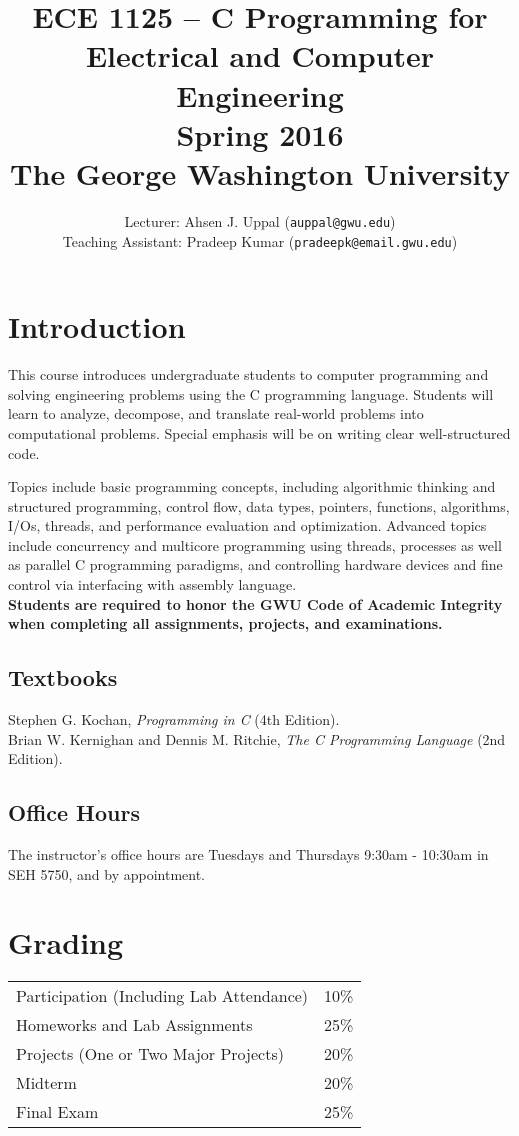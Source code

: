 \documentclass{article}
\title{ECE 1125 -- C Programming for Electrical and Computer Engineering \\ Spring 2016 \\ The George Washington University}
\author{Lecturer: Ahsen J. Uppal (\texttt{auppal@gwu.edu}) \\
Teaching Assistant: Pradeep Kumar (\texttt{pradeepk@email.gwu.edu})}
\date{}
\begin{document}
\maketitle

\section{Introduction}
This course introduces undergraduate students to computer programming
and solving engineering problems using the C programming
language. Students will learn to analyze, decompose, and translate
real-world problems into computational problems. Special emphasis will
be on writing clear well-structured code.

Topics include basic programming concepts, including algorithmic
thinking and structured programming, control flow, data types,
pointers, functions, algorithms, I/Os, threads, and performance
evaluation and optimization. Advanced topics include concurrency and
multicore programming using threads, processes as well as parallel C
programming paradigms, and controlling hardware devices and fine
control via interfacing with assembly language.
\\

\noindent
\textbf{Students are required to honor the GWU Code of Academic Integrity when completing all assignments, projects, and examinations.}

\subsection{Textbooks}
Stephen G. Kochan, \textit{Programming in C} (4th Edition). \\
Brian W. Kernighan and Dennis M. Ritchie, \textit{The C Programming Language} (2nd Edition).

\subsection{Office Hours}
The instructor's office hours are Tuesdays and Thursdays 9:30am - 10:30am in SEH 5750, and by appointment.


\section{Grading}
\begin{center}
\begin{tabular}{|l|l|}
\hline
Participation (Including Lab Attendance) & 10\% \\
Homeworks and Lab Assignments & 25\% \\
Projects (One or Two Major Projects) & 20\% \\
Midterm   &     20\% \\
Final Exam &    25\% \\

\hline
\end{tabular}
\end{center}
\end{document}
